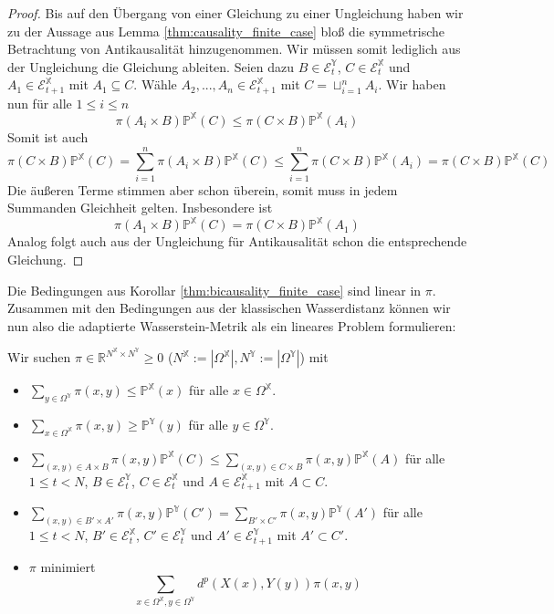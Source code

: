 \begin{proof}
    Bis auf den Übergang von einer Gleichung zu einer Ungleichung haben wir zu der Aussage aus Lemma \ref{thm:causality_finite_case} bloß die symmetrische Betrachtung von Antikausalität hinzugenommen. Wir müssen somit lediglich aus der Ungleichung die Gleichung ableiten. Seien dazu $B \in \mathcal{E}_t^\mathbb{Y}$, $C \in \mathcal{E}_t^\mathbb{X}$ und $A_1\in \mathcal{E}_{t+1}^\mathbb{X}$ mit $A_1 \subseteq C$. Wähle $A_2,...,A_n \in \mathcal{E}_{t+1}^\mathbb{X}$ mit $C = \sqcup_{i=1}^n A_i$. Wir haben nun für alle $1\leq i\leq n$
    $$\pi(A_i \times B) \mathbb{P}^\mathbb{X}(C) \leq \pi(C \times B) \mathbb{P}^\mathbb{X}(A_i)$$
    Somit ist auch 
    $$\pi(C\times B) \mathbb{P}^\mathbb{X}(C) = \sum_{i=1}^n \pi(A_i\times B) \mathbb{P}^\mathbb{X}(C) \leq \sum_{i=1}^n\pi(C\times B)\mathbb{P}^\mathbb{X}(A_i) = \pi(C\times B) \mathbb{P}^\mathbb{X}(C)$$
    Die äußeren Terme stimmen aber schon überein, somit muss in jedem Summanden Gleichheit gelten. Insbesondere ist 
    $$\pi(A_1 \times B) \mathbb{P}^\mathbb{X}(C) = \pi(C\times B) \mathbb{P}^\mathbb{X}(A_1)$$
    Analog folgt auch aus der Ungleichung für Antikausalität schon die entsprechende Gleichung.
\end{proof}

Die Bedingungen aus Korollar \ref{thm:bicausality_finite_case} sind linear in $\pi$. Zusammen mit den Bedingungen aus der klassischen Wasserdistanz können wir nun also die adaptierte Wasserstein-Metrik als ein lineares Problem formulieren: 

Wir suchen $\pi \in \mathbb{R}^{N^\mathbb{X}\times N^\mathbb{Y}} \geq 0$ ($N^\mathbb{X} := |\Omega^\mathbb{X}|, N^\mathbb{Y}:=|\Omega^\mathbb{Y}|$) mit 
\begin{itemize}
    \item $\sum_{y \in \Omega^\mathbb{Y}} \pi(x,y) \leq \mathbb{P}^\mathbb{X}(x)$ für alle $x \in \Omega^\mathbb{X}$.
    \item $\sum_{x \in \Omega^\mathbb{X}} \pi(x,y) \geq \mathbb{P}^\mathbb{Y}(y)$ für alle $y \in \Omega^\mathbb{Y}$.
    \item $\sum_{(x,y) \in A\times B} \pi(x,y) \mathbb{P}^\mathbb{X}(C) \leq \sum_{(x,y) \in C \times B} \pi(x,y) \mathbb{P}^\mathbb{X}(A)$ für alle $1 \leq t < N$, $B \in \mathcal{E}_t^\mathbb{Y}$, $C \in \mathcal{E}_t^\mathbb{X}$ und $A \in \mathcal{E}_{t+1}^\mathbb{X}$ mit $A \subset C$.
    \item $\sum_{(x,y) \in B' \times A'} \pi(x,y) \mathbb{P}^\mathbb{Y}(C') = \sum_{B' \times C'} \pi(x,y) \mathbb{P}^\mathbb{Y}(A')$ für alle $1 \leq t < N$, $B' \in \mathcal{E}_t^\mathbb{X}$, $C' \in \mathcal{E}_t^\mathbb{Y}$ und $A' \in \mathcal{E}_{t+1}^\mathbb{Y}$ mit $A' \subset C'$.
    \item $\pi$ minimiert 
    $$\sum_{x\in\Omega^\mathbb{X}, y\in \Omega^\mathbb{Y}} d^p(X(x), Y(y)) \pi(x,y)$$
\end{itemize}

